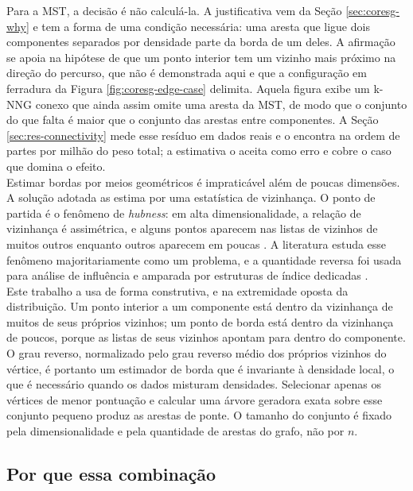 Para a \ac{MST}, a decisão é não calculá-la. A justificativa vem da Seção \ref{sec:coresg-why} e tem a forma de uma condição necessária: uma aresta que ligue dois componentes separados por densidade parte da borda de um deles. A afirmação se apoia na hipótese de que um ponto interior tem um vizinho mais próximo na direção do percurso, que não é demonstrada aqui e que a configuração em ferradura da Figura \ref{fig:coresg-edge-case} delimita. Aquela figura exibe um \ac{k-NNG} conexo que ainda assim omite uma aresta da \ac{MST}, de modo que o conjunto do que falta é maior que o conjunto das arestas entre componentes. A Seção \ref{sec:res-connectivity} mede esse resíduo em dados reais e o encontra na ordem de partes por milhão do peso total; a estimativa o aceita como erro e cobre o caso que domina o efeito.\\

Estimar bordas por meios geométricos é impraticável além de poucas dimensões. A solução adotada as estima por uma estatística de vizinhança. O ponto de partida é o fenômeno de \textit{hubness}: em alta dimensionalidade, a relação de vizinhança é assimétrica, e alguns pontos aparecem nas listas de vizinhos de muitos outros enquanto outros aparecem em poucas \cite{hubs}. A literatura estuda esse fenômeno majoritariamente como um problema, e a quantidade reversa foi usada para análise de influência \cite{influencesets} e amparada por estruturas de índice dedicadas \cite{rdnntree}.\\

Este trabalho a usa de forma construtiva, e na extremidade oposta da distribuição. Um ponto interior a um componente está dentro da vizinhança de muitos de seus próprios vizinhos; um ponto de borda está dentro da vizinhança de poucos, porque as listas de seus vizinhos apontam para dentro do componente. O grau reverso, normalizado pelo grau reverso médio dos próprios vizinhos do vértice, é portanto um estimador de borda que é invariante à densidade local, o que é necessário quando os dados misturam densidades. Selecionar apenas os vértices de menor pontuação e calcular uma árvore geradora exata sobre esse conjunto pequeno produz as arestas de ponte. O tamanho do conjunto é fixado pela dimensionalidade e pela quantidade de arestas do grafo, não por $n$.\\

\subsection{Por que essa combinação\label{sec:adopted-why}}


